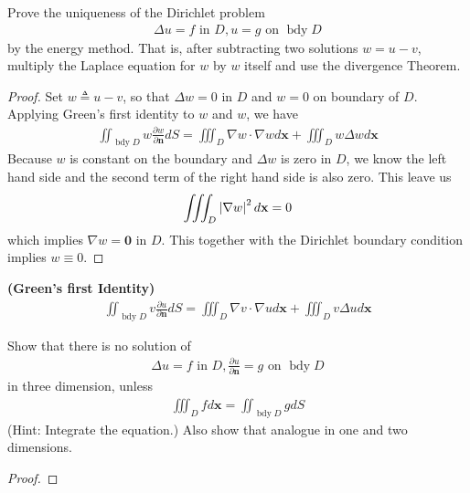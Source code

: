 \documentclass{report}
\begin{document}
\begin{question}{}{}
Prove the uniqueness of the Dirichlet problem 
\begin{align*}
\Delta u= f \text{ in }D,u=g\text{ on }\operatorname{bdy}D
\end{align*}
by the energy method. That is, after subtracting two solutions $w=u-v$, multiply the Laplace equation for  $w$ by $w$ itself and use the divergence Theorem. 
\end{question}
\begin{proof}
Set $w\triangleq u-v$, so that $\Delta w=0$ in $D$ and  $w=0$ on boundary of $D$. Applying Green's first identity to $w$ and  $w$, we have 
\begin{align*}
  \iint_{\operatorname{bdy}D} w \frac{\partial w}{\partial \textbf{n}}dS =\iiint_D \nabla w \cdot \nabla w d\textbf{x}+ \iiint_D w \Delta w d\textbf{x} 
\end{align*}
Because $w$ is constant on the boundary and $\Delta w$ is zero in $D$, we know the left hand side and the second term of the right hand side is also zero. This leave us 
 \begin{align*}
\iiint_D  \left|\nabla w\right|^2 d \textbf{x}=0 
\end{align*}
which implies $\nabla w=\textbf{0}$ in $D$.  This together with the Dirichlet boundary condition implies $w\equiv 0$.  
\end{proof}
\begin{theorem}
\textbf{(Green's first Identity)}
\begin{align*}
\iint_{\operatorname{bdy}D} v \frac{\partial u}{\partial \textbf{n}}dS = \iiint_D \nabla v \cdot \nabla u d\textbf{x} + \iiint_D v \Delta u d\textbf{x}
\end{align*}
\end{theorem}
\begin{question}{}{}
Show that there is no solution of 
\begin{align*}
\Delta u =f \text{ in }D, \frac{\partial u}{\partial \textbf{n}}=g\text{ on }\operatorname{bdy}D
\end{align*}
in three dimension, unless
\begin{align*}
\iiint_D fd\textbf{x}= \iint_{\operatorname{bdy}D}gdS
\end{align*}
(Hint: Integrate the equation.) Also show that analogue in one and two dimensions. 
\end{question}
\begin{proof}
\end{proof}
\end{document}
